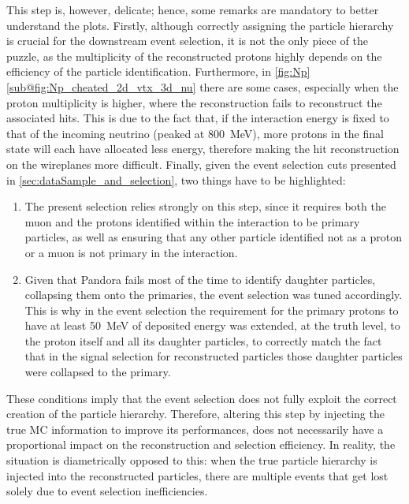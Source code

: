 This step is, however, delicate; hence, some remarks are mandatory to better understand the plots. Firstly, although correctly assigning the particle hierarchy is crucial for the downstream event selection, it is not the only piece of the puzzle, as the multiplicity of the reconstructed protons highly depends on the efficiency of the particle identification. Furthermore, in \autoref{fig:Np}\ref{sub@fig:Np_cheated_2d_vtx_3d_nu} there are some cases, especially when the proton multiplicity is higher, where the reconstruction fails to reconstruct the associated hits. This is due to the fact that, if the interaction energy is fixed to that of the incoming neutrino (peaked at \SI{800}{\mega\electronvolt}), more protons in the final state will each have allocated less energy, therefore making the hit reconstruction on the wireplanes more difficult. Finally, given the event selection cuts presented in \autoref{sec:dataSample_and_selection}, two things have to be highlighted: \begin{enumerate}
    \item The present selection relies strongly on this step, since it requires both the muon and the protons identified within the interaction to be primary particles, as well as ensuring that any other particle identified not as a proton or a muon is not primary in the interaction. 
    \item Given that Pandora fails most of the time to identify daughter particles, collapsing them onto the primaries, the event selection was tuned accordingly. This is why in the event selection the requirement for the primary protons to have at least \SI{50}{\mega\electronvolt} of deposited energy was extended, at the truth level, to the proton itself and all its daughter particles, to correctly match the fact that in the signal selection for reconstructed particles those daughter particles were collapsed to the primary. 
\end{enumerate} 

These conditions imply that the event selection does not fully exploit the correct creation of the particle hierarchy. Therefore, altering this step by injecting the true MC information to improve its performances,  does not necessarily have a proportional impact on the reconstruction and selection efficiency. In reality, the situation is diametrically opposed to this: when the true particle hierarchy is injected into the reconstructed particles, there are multiple events that get lost solely due to event selection inefficiencies. 


